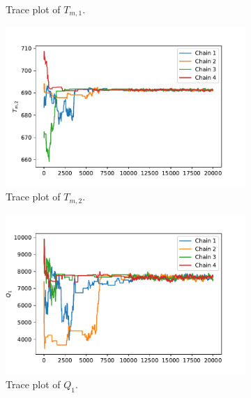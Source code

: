 \begin{figure}[h!]
\begin{subfigure}{.5\textwidth}
  \caption{Trace plot of $T_{m,1}$.}
  \label{fig:subtpTm1}
\end{subfigure}%
\begin{subfigure}{.5\textwidth}
  \centering
  \includegraphics[width=\linewidth]{figures/bayesian/EXP_Q/trace_plot_Tm2.pdf}
  \caption{Trace plot of $T_{m,2}$.}
  \label{fig:subtpTm2}
\end{subfigure}
\newline
\begin{subfigure}{.5\textwidth}
  \centering
  \includegraphics[width=\linewidth]{figures/bayesian/EXP_Q/trace_plot_Q1.pdf}
  \caption{Trace plot of $Q_{1}$.}
  \label{fig:subtpTm1}
\end{subfigure}%
\begin{subfigure}{.5\textwidth}
  \centering

\end{subfigure}
\end{figure}
